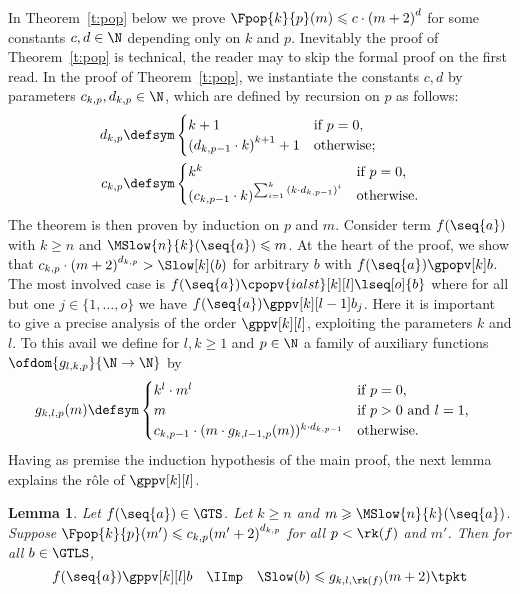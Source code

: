 \documentclass{LMCS}
\newtheorem{lemma}[thm]{Lemma}
\begin{document}
In Theorem~\ref{t:pop} below we prove $\Fpop{k}{p}(m) \leqslant c \cdot {(m+2)}^{d}$
for some constants $c,d \in \N$ depending only on $k$ and $p$. 
Inevitably the proof of Theorem~\ref{t:pop} is technical, 
the reader may to skip the formal proof on the first read.
In the proof of Theorem~\ref{t:pop}, we instantiate the constants $c,d$ by parameters $c_{k,p},d_{k,p} \in \N$, 
which are defined by recursion on $p$ as follows:\label{d:dkp:ckp}
\begin{align*}
 d_{k,p} &\defsym 
 \begin{cases}
  k+1 & \text{if $p = 0$,} \\
  {(d_{k,p-1} \cdot k)}^{k+1}+1 & \text{otherwise;}
 \end{cases}
 \\
 c_{k,p} &\defsym 
 \begin{cases}
  k^k & \text{if $p = 0$,} \\
  {(c_{k,p-1} \cdot k)}^{\sum_{i=1}^k {(k \cdot d_{k,p-1})}^i} & \text{otherwise.}
 \end{cases}
\end{align*}
The theorem is then proven by induction on $p$ and $m$.
Consider term $f(\seq{a})$ with $k \geqslant n$ and $\MSlow{n}{k}(\seq{a}) \leqslant m$.
At the heart of the proof, we show that 
$c_{k,p} \cdot {(m+2)}^{d_{k,p}} > \Slow[k](b)$ for arbitrary $b$ with $f(\seq{a}) \gpopv[k] b$. 
The most involved case is $f(\seq{a}) \cpopv{ialst}[k][l] \lseq[o]{b}$ where for all 
but one $j \in \{1,\dots,o\}$ we have $f(\seq{a}) \gppv[k][l-1] b_j$. 
Here it is important to give a precise analysis of the order $\gppv[k][l]$, 
exploiting the parameters $k$ and $l$. 
To this avail we define for $l,k \geqslant 1$ and $p \in \N$ a family of auxiliary functions 
$\ofdom{g_{l,k,p}}{\N \to \N}$ by
\begin{align*}
  g_{k,l,p}(m) & \defsym 
  \begin{cases}
    k^l \cdot m^l & \text {if $p = 0$,} \\
    m & \text{if $p > 0$ and $l = 1$,} \\
    c_{k,p-1} \cdot (m \cdot g_{k,l-1,p}(m))^{k \cdot d_{k,p-1}} & \text{otherwise.}
  \end{cases}
\end{align*}
Having as premise the induction hypothesis of the main proof, the next lemma 
explains the r\^ole of $\gppv[k][l]$.
\begin{lemma}\label{l:pop:aux}
  Let $f(\seq{a})  \in \GTS$.
  Let $k \geqslant n$ and 
  $m \geqslant \MSlow{n}{k}(\seq{a})$.
  Suppose $\Fpop{k}{p}(m') \leqslant c_{k,p} {(m'+2)}^{d_{k,p}}$ for all $p < \rk(f)$ and $m'$.
  Then for all $b \in \GTLS$, 
  $$
  f(\seq{a}) \gppv[k][l] b \quad \IImp \quad \Slow(b) \leqslant g_{k,l,\rk(f)}(m+2) \tpkt
  $$
\end{lemma}
\end{document}
